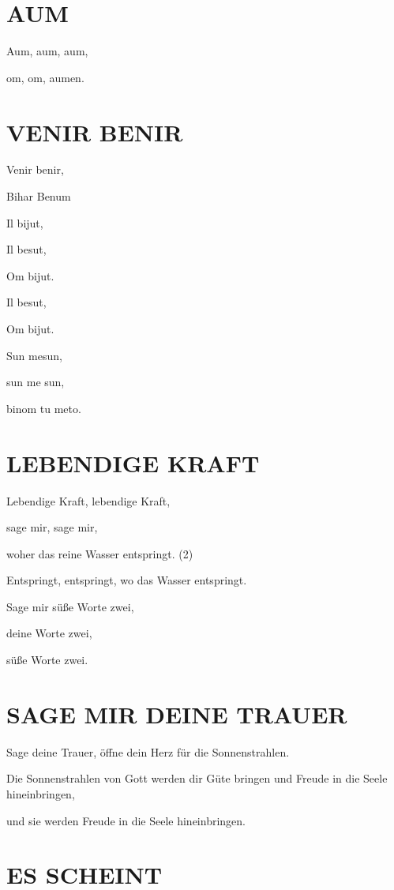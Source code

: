 \documentclass[11pt,a5paper,twoside]{article}
\begin{document}
\section[Aum]{AUM}

Aum, aum, aum, 

om, om, aumen.

\section[Venir Benir]{VENIR BENIR}

Venir benir, 

Bihar Benum 

Il bijut,

Il besut, 

Om bijut. 

Il besut, 

Om bijut. 

Sun mesun, 

sun me sun, 

binom tu meto. 

\section[Lebendige Kraft]{LEBENDIGE KRAFT}

Lebendige Kraft, lebendige Kraft,

sage mir, sage mir,

woher das reine Wasser entspringt. (2)

Entspringt, entspringt, wo das Wasser entspringt.

Sage mir süße Worte zwei,

deine Worte zwei, 

süße Worte zwei.

\section[Sage mir deine Trauer]{SAGE MIR DEINE TRAUER}

Sage deine Trauer, öffne dein Herz für die Sonnenstrahlen.

Die Sonnenstrahlen von Gott werden dir Güte bringen und Freude in die Seele hineinbringen,

und sie werden Freude in die Seele hineinbringen.

\section[Es scheint]{ES SCHEINT}
\end{document}

